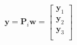 \begin{equation}
\mathbf{y} = \mathbf{P}_i\mathbf{w} =
    \left[
        \begin{matrix}
            \mathbf{y}_1\\
            \mathbf{y}_2\\
            \mathbf{y}_3\\
        \end{matrix}
    \right]
\end{equation}
